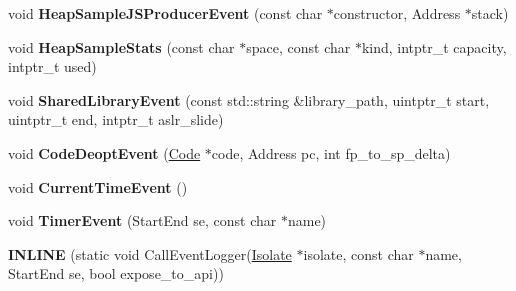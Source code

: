 \begin{DoxyCompactItemize}
\item 
void {\bfseries Heap\+Sample\+J\+S\+Producer\+Event} (const char $\ast$constructor, Address $\ast$stack)\hypertarget{classv8_1_1internal_1_1_logger_ad8e5169e654b8f122eca82f69e184f05}{}\label{classv8_1_1internal_1_1_logger_ad8e5169e654b8f122eca82f69e184f05}

\item 
void {\bfseries Heap\+Sample\+Stats} (const char $\ast$space, const char $\ast$kind, intptr\+\_\+t capacity, intptr\+\_\+t used)\hypertarget{classv8_1_1internal_1_1_logger_a916fdfb226cd57687bca72dae69f2a58}{}\label{classv8_1_1internal_1_1_logger_a916fdfb226cd57687bca72dae69f2a58}

\item 
void {\bfseries Shared\+Library\+Event} (const std\+::string \&library\+\_\+path, uintptr\+\_\+t start, uintptr\+\_\+t end, intptr\+\_\+t aslr\+\_\+slide)\hypertarget{classv8_1_1internal_1_1_logger_af12e96b0f6ea17213bc847e06fd10508}{}\label{classv8_1_1internal_1_1_logger_af12e96b0f6ea17213bc847e06fd10508}

\item 
void {\bfseries Code\+Deopt\+Event} (\hyperlink{classv8_1_1internal_1_1_code}{Code} $\ast$code, Address pc, int fp\+\_\+to\+\_\+sp\+\_\+delta)\hypertarget{classv8_1_1internal_1_1_logger_abb4f0d8943cb1444df313a54d3f06593}{}\label{classv8_1_1internal_1_1_logger_abb4f0d8943cb1444df313a54d3f06593}

\item 
void {\bfseries Current\+Time\+Event} ()\hypertarget{classv8_1_1internal_1_1_logger_aa0a465dbed17a0793a716223c0feaecf}{}\label{classv8_1_1internal_1_1_logger_aa0a465dbed17a0793a716223c0feaecf}

\item 
void {\bfseries Timer\+Event} (Start\+End se, const char $\ast$name)\hypertarget{classv8_1_1internal_1_1_logger_a9e1006be8887830cb167c3080a509b71}{}\label{classv8_1_1internal_1_1_logger_a9e1006be8887830cb167c3080a509b71}

\item 
{\bfseries I\+N\+L\+I\+NE} (static void Call\+Event\+Logger(\hyperlink{classv8_1_1internal_1_1_isolate}{Isolate} $\ast$isolate, const char $\ast$name,                                                                                                                                           Start\+End se, bool expose\+\_\+to\+\_\+api))\hypertarget{classv8_1_1internal_1_1_logger_a80f112b1c823c395c6b015895f8fa9f1}{}\label{classv8_1_1internal_1_1_logger_a80f112b1c823c395c6b015895f8fa9f1}


\end{DoxyCompactItemize}
